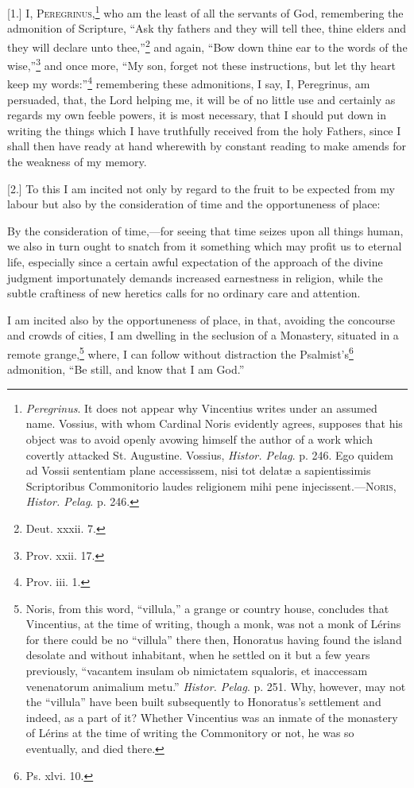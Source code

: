
[1.] \textsc{I, Peregrinus},\footnote{\emph{Peregrinus}. It does not appear why Vincentius writes under an assumed name. Vossius, with whom Cardinal Noris evidently agrees, supposes that his object was to avoid openly avowing himself the author of a work which covertly attacked St. Augustine. Vossius, \emph{Histor. Pelag}. p. 246. Ego quidem ad Vossii sententiam plane accessissem, nisi tot delatæ a sapientissimis Scriptoribus Commonitorio laudes religionem mihi pene injecissent.—\textsc{Noris}, \emph{Histor. Pelag}. p. 246.} who am the least of all the servants of God, remembering the admonition of Scripture, “Ask thy fathers and they will tell thee, thine elders and they will declare unto thee,”\footnote{Deut. xxxii. 7.} and again, “Bow down thine ear to the words of the wise,”\footnote{Prov. xxii. 17.} and once more, “My son, forget not these instructions, but let thy heart keep my words:”\footnote{Prov. iii. 1.} remembering these admonitions, I say, I, Peregrinus, am persuaded, that, the Lord helping me, it will be of no little use and certainly as regards my own feeble powers, it is most necessary, that I should put down in writing the things which I have truthfully received from the holy Fathers, since I shall then have ready at hand wherewith by constant reading to make amends for the weakness of my memory.

[2.] To this I am incited not only by regard to the fruit to be expected from my labour but also by the consideration of time and the opportuneness of place:

By the consideration of time,—for seeing that time seizes upon all things human, we also in turn ought to snatch from it something which may profit us to eternal life, especially since a certain awful expectation of the approach of the divine judgment importunately demands increased earnestness in religion, while the subtle craftiness of new heretics calls for no ordinary care and attention.

I am incited also by the opportuneness of place, in that, avoiding the concourse and crowds of cities, I am dwelling in the seclusion of a Monastery, situated in a remote grange,\footnote{Noris, from this word, “villula,” a grange or country house, concludes that Vincentius, at the time of writing, though a monk, was not a monk of Lérins for there could be no “villula” there then, Honoratus having found the island desolate and without inhabitant, when he settled on it but a few years previously, “vacantem insulam ob nimictatem squaloris, et inaccessam venenatorum animalium metu.” \emph{Histor. Pelag}. p. 251. Why, however, may not the “villula” have been built subsequently to Honoratus’s settlement and indeed, as a part of it? Whether Vincentius was an inmate of the monastery of Lérins at the time of writing the Commonitory or not, he was so eventually, and died there.} where, I can follow without distraction the Psalmist’s\footnote{Ps. xlvi. 10.} admonition, “Be still, and know that I am God.”

